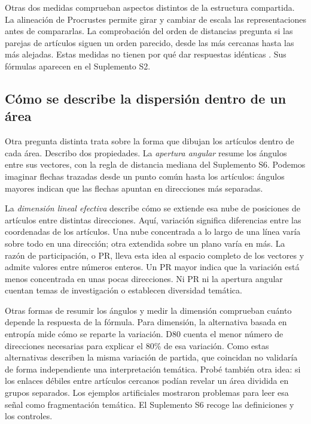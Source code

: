 \documentclass[12pt]{article}
\begin{document}
Otras dos medidas comprueban aspectos distintos de la estructura compartida. La alineación de Procrustes permite girar y cambiar de escala las representaciones antes de compararlas. La comprobación del orden de distancias pregunta si las parejas de artículos siguen un orden parecido, desde las más cercanas hasta las más alejadas. Estas medidas no tienen por qué dar respuestas idénticas \citep{NEURIPS2021_252a3dba,pmlr-v285-williams24a}. Sus fórmulas aparecen en el Suplemento S2.

\subsection{Cómo se describe la dispersión dentro de un área}
Otra pregunta distinta trata sobre la forma que dibujan los artículos dentro de cada área. Describo dos propiedades. La \emph{apertura angular} resume los ángulos entre sus vectores, con la regla de distancia mediana del Suplemento S6. Podemos imaginar flechas trazadas desde un punto común hasta los artículos: ángulos mayores indican que las flechas apuntan en direcciones más separadas.

La \emph{dimensión lineal efectiva} describe cómo se extiende esa nube de posiciones de artículos entre distintas direcciones. Aquí, variación significa diferencias entre las coordenadas de los artículos. Una nube concentrada a lo largo de una línea varía sobre todo en una dirección; otra extendida sobre un plano varía en más. La razón de participación, o PR, lleva esta idea al espacio completo de los vectores y admite valores entre números enteros. Un PR mayor indica que la variación está menos concentrada en unas pocas direcciones. Ni PR ni la apertura angular cuentan temas de investigación o establecen diversidad temática.

Otras formas de resumir los ángulos y medir la dimensión comprueban cuánto depende la respuesta de la fórmula. Para dimensión, la alternativa basada en entropía mide cómo se reparte la variación. D80 cuenta el menor número de direcciones necesarias para explicar el 80\% de esa variación. Como estas alternativas describen la misma variación de partida, que coincidan no validaría de forma independiente una interpretación temática. Probé también otra idea: si los enlaces débiles entre artículos cercanos podían revelar un área dividida en grupos separados. Los ejemplos artificiales mostraron problemas para leer esa señal como fragmentación temática. El Suplemento S6 recoge las definiciones y los controles.
\end{document}
